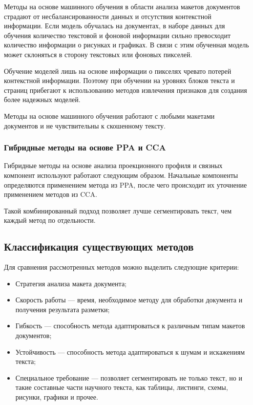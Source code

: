 Методы на основе машинного обучения в области анализа макетов документов страдают от несбалансированности данных и отсутствия контекстной информации.
Если модель обучалась на документах, в наборе данных для обучения количество текстовой и фоновой информации сильно превосходит количество информации о рисунках и графиках.
В связи с этим обученная модель может склоняться в сторону текстовых или фоновых пикселей.~\cite{dla-survey}

Обучение моделей лишь на основе информации о пикселях чревато потерей контекстной информации.
Поэтому при обучении на уровнях блоков текста и страниц прибегают к использованию методов извлечения признаков для создания более надежных моделей.~\cite{dla-survey}

Методы на основе машинного обучения работают с любыми макетами документов и не чувствительны к скошенному тексту.

\subsubsection{Гибридные методы на основе PPA и CCA}

Гибридные методы на основе анализа проекционного профиля и связных компонент используют работают следующим образом.
Начальные компоненты определяются применением метода из PPA, после чего происходит их уточнение применением методов из CCA.

Такой комбинированный подход позволяет лучше сегментировать текст, чем каждый метод по отдельности.

\subsection{Классификация существующих методов}


Для сравнения рассмотренных методов можно выделить следующие критерии:
\begin{itemize}
    \item Стратегия анализа макета документа;
    \item Скорость работы --- время, необходимое методу для обработки документа и получения результата разметки;
    \item Гибкость --- способность метода адаптироваться к различным типам макетов документов;
    \item Устойчивость --- способность метода адаптироваться к шумам и искажениям текста;
    \item Специальное требование --- позволяет сегментировать не только текст, но и такие составные части научного текста, как таблицы, листинги, схемы, рисунки, графики и прочее.
\end{itemize}

